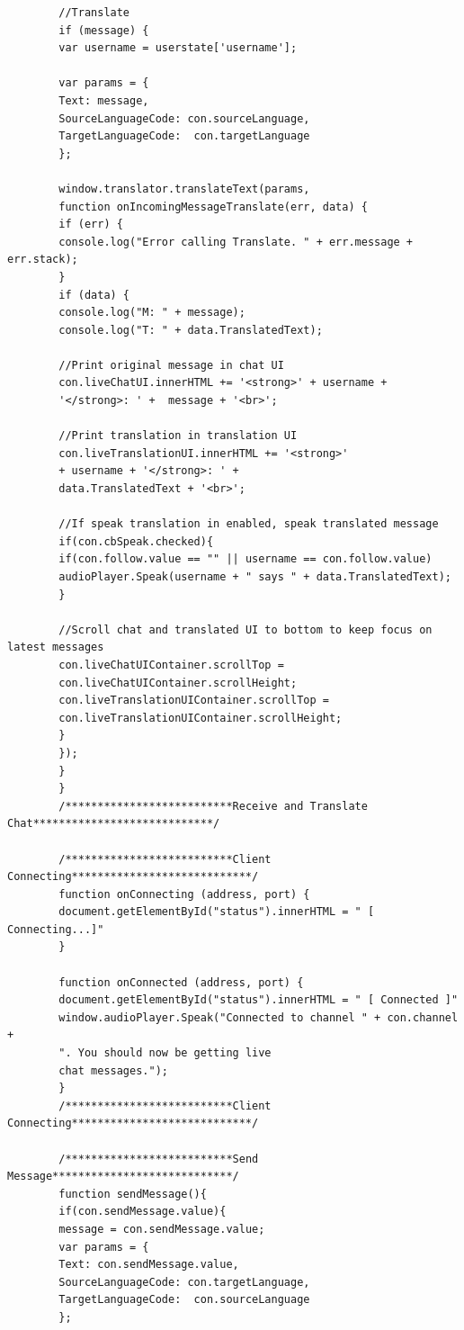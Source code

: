 \documentclass[english,runningheads,a4paper]{llncs}[2018/03/10]
\begin{document}
\begin{verbatim}
        //Translate
        if (message) {
        var username = userstate['username'];
        
        var params = {
        Text: message,
        SourceLanguageCode: con.sourceLanguage,
        TargetLanguageCode:  con.targetLanguage
        };
        
        window.translator.translateText(params, 
        function onIncomingMessageTranslate(err, data) {
        if (err) {
        console.log("Error calling Translate. " + err.message + err.stack);
        }
        if (data) {
        console.log("M: " + message);
        console.log("T: " + data.TranslatedText);
        
        //Print original message in chat UI
        con.liveChatUI.innerHTML += '<strong>' + username + 
        '</strong>: ' +  message + '<br>';
        
        //Print translation in translation UI
        con.liveTranslationUI.innerHTML += '<strong>' 
        + username + '</strong>: ' +
        data.TranslatedText + '<br>';
        
        //If speak translation in enabled, speak translated message
        if(con.cbSpeak.checked){
        if(con.follow.value == "" || username == con.follow.value)
        audioPlayer.Speak(username + " says " + data.TranslatedText);
        }
        
        //Scroll chat and translated UI to bottom to keep focus on latest messages
        con.liveChatUIContainer.scrollTop = 
        con.liveChatUIContainer.scrollHeight;
        con.liveTranslationUIContainer.scrollTop = 
        con.liveTranslationUIContainer.scrollHeight;
        }
        });
        }
        }
        /**************************Receive and Translate Chat****************************/
        
        /**************************Client Connecting****************************/
        function onConnecting (address, port) {
        document.getElementById("status").innerHTML = " [ Connecting...]"
        }
        
        function onConnected (address, port) {
        document.getElementById("status").innerHTML = " [ Connected ]"
        window.audioPlayer.Speak("Connected to channel " + con.channel +
        ". You should now be getting live
        chat messages.");
        }
        /**************************Client Connecting****************************/
        
        /**************************Send Message****************************/
        function sendMessage(){
        if(con.sendMessage.value){
        message = con.sendMessage.value;
        var params = {
        Text: con.sendMessage.value,
        SourceLanguageCode: con.targetLanguage,
        TargetLanguageCode:  con.sourceLanguage
        };
        

\end{verbatim}
\end{document}

